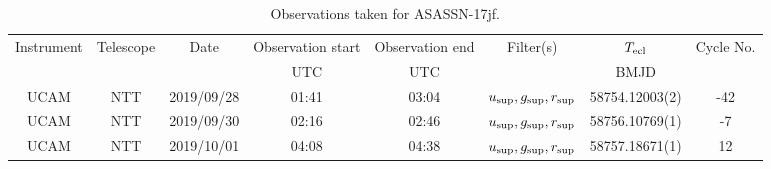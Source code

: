 \begin{table}
	\begin{center}
		\caption{Observations taken for ASASSN-17jf.}
		\label{table:observing:observation logs ASASSN-17jf}
		\begin{tabular}{cccccccc}
			\hline
			Instrument & Telescope & Date & Observation start & Observation end & Filter(s) & $T_{\rm ecl}$ & Cycle No. \\
			 &  &  & UTC & UTC &  & BMJD &  \\
			\hline
			\hline
			UCAM & NTT & 2019/09/28 & 01:41 & 03:04 & $u_{\rm sup},g_{\rm sup},r_{\rm sup}$ & 58754.12003(2)                                                                                                            &                                         -42 \\
			UCAM & NTT & 2019/09/30 & 02:16 & 02:46 & $u_{\rm sup},g_{\rm sup},r_{\rm sup}$ & 58756.10769(1)                                                                                                            &                                          -7 \\
			UCAM & NTT & 2019/10/01 & 04:08 & 04:38 & $u_{\rm sup},g_{\rm sup},r_{\rm sup}$ & 58757.18671(1)                                                                                                            &                                          12 \\
		   \hline
		\end{tabular}
	\end{center}
\end{table}
